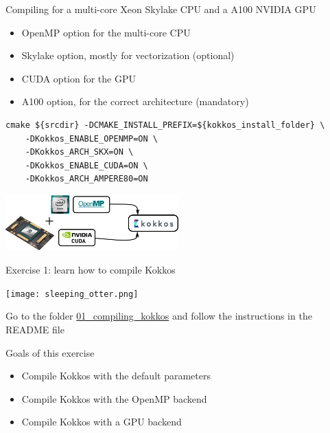 \documentclass[aspectratio=169]{beamer}
\begin{document}
\begin{frame}[fragile]{Compiling for a multi-core Xeon Skylake CPU and a A100 NVIDIA GPU}
    \begin{itemize}
        \item OpenMP option for the multi-core CPU
        \item Skylake option, mostly for vectorization (optional)
        \item CUDA option for the GPU
        \item A100 option, for the correct architecture (mandatory)
    \end{itemize}
    \begin{verbatim}
cmake ${srcdir} -DCMAKE_INSTALL_PREFIX=${kokkos_install_folder} \
    -DKokkos_ENABLE_OPENMP=ON \
    -DKokkos_ARCH_SKX=ON \
    -DKokkos_ENABLE_CUDA=ON \
    -DKokkos_ARCH_AMPERE80=ON
    \end{verbatim}
    \begin{center}
        \includegraphics[width=0.5\textwidth]{kokkos_a100_backend.png}
    \end{center}
\end{frame}

\begin{frame}{Exercise 1: learn how to compile Kokkos}
    \begin{center}
    \texttt{[image: sleeping\_otter.png]}
    \end{center}

    Go to the folder \href{https://github.com/CExA-project/cexa-kokkos-tutorials/tree/main/exercises/01_compiling_kokkos}{01\_compiling\_kokkos} and follow the instructions in the README file

    \begin{block}{Goals of this exercise}
        \begin{itemize}
            \item Compile Kokkos with the default parameters
            \item Compile Kokkos with the OpenMP backend
            \item Compile Kokkos with a GPU backend
        \end{itemize}
    \end{block}
\end{frame}
\end{document}
